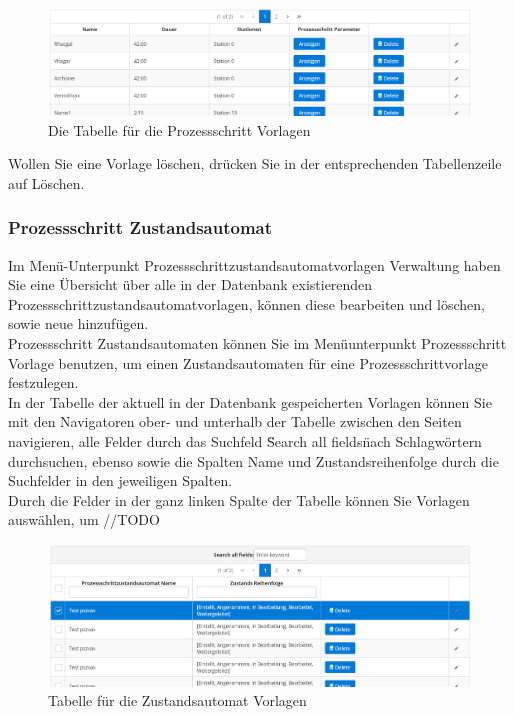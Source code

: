 \documentclass[enabledeprecatedfontcommands,fontsize=12pt,paper=a4,twoside]{scrartcl}
\begin{document}
\begin{figure}[h!]
\begin{center}
 \includegraphics[width=\textwidth]{screenshots/pk/prozessschrittvorlagetabelle.png}
  \caption{Die Tabelle für die Prozessschritt Vorlagen}
  \label{fig:boat2}
\end{center}
\end{figure}


Wollen Sie eine Vorlage löschen, drücken Sie in der entsprechenden Tabellenzeile auf Löschen. \\


\subsubsection{Prozessschritt Zustandsautomat}

Im Menü-Unterpunkt Prozessschrittzustandsautomatvorlagen Verwaltung haben Sie eine Übersicht über alle in der Datenbank existierenden Prozessschrittzustandsautomatvorlagen, können diese bearbeiten und löschen, sowie neue hinzufügen. \\

Prozessschritt Zustandsautomaten können Sie im Menüunterpunkt Prozessschritt Vorlage benutzen, um einen Zustandsautomaten für eine Prozessschrittvorlage festzulegen. \\

In der Tabelle der aktuell in der Datenbank gespeicherten Vorlagen können Sie mit den Navigatoren ober- und unterhalb der Tabelle zwischen den Seiten navigieren, alle Felder durch das Suchfeld \"Search all fields\" nach Schlagwörtern durchsuchen, ebenso sowie die Spalten Name und Zustandsreihenfolge durch die Suchfelder in den jeweiligen Spalten. \\
Durch die Felder in der ganz linken Spalte der Tabelle können Sie Vorlagen auswählen, um //TODO \\

\begin{figure}[h!]
\begin{center}
 \includegraphics[width=\textwidth]{screenshots/pk/zustandsautomattabelle.png}
  \caption{Tabelle für die Zustandsautomat Vorlagen}
  \label{fig:boat2}
\end{center}
\end{figure}
\end{document}
